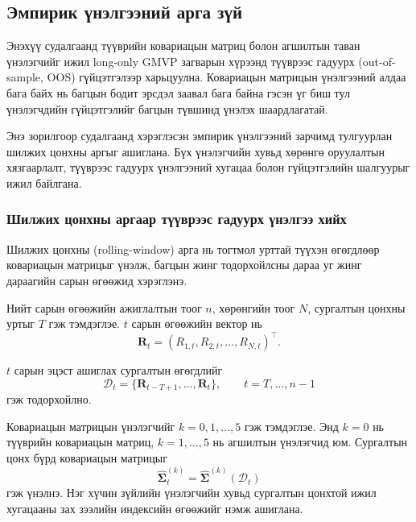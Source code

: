 \subsection{Эмпирик үнэлгээний арга зүй}
\label{subsec:empirical_framework}

Энэхүү судалгаанд түүврийн ковариацын матриц болон
агшилтын таван үнэлэгчийг ижил long-only GMVP
загварын хүрээнд түүврээс гадуурх
(out-of-sample, OOS) гүйцэтгэлээр харьцуулна.
Ковариацын матрицын үнэлгээний алдаа бага байх
нь багцын бодит эрсдэл заавал бага байна гэсэн
үг биш тул үнэлэгчдийн гүйцэтгэлийг багцын
түвшинд үнэлэх шаардлагатай.

Энэ зорилгоор
\citep{LedoitWolf2003,DeMiguelGarlappiUppal2009}
судалгаанд хэрэглэсэн эмпирик үнэлгээний
зарчимд тулгуурлан шилжих цонхны аргыг
ашиглана. Бүх үнэлэгчийн хувьд хөрөнгө
оруулалтын хязгаарлалт, түүврээс гадуурх
үнэлгээний хугацаа болон гүйцэтгэлийн
шалгуурыг ижил байлгана.


\subsubsection{Шилжих цонхны аргаар түүврээс гадуурх
	үнэлгээ хийх}
\label{subsubsec:rolling_window}

Шилжих цонхны (rolling-window) арга нь тогтмол
урттай түүхэн өгөгдлөөр ковариацын матрицыг
үнэлж, багцын жинг тодорхойлсны дараа уг
жинг дараагийн сарын өгөөжид хэрэглэнэ.

Нийт сарын өгөөжийн ажиглалтын тоог $n$,
хөрөнгийн тоог $N$, сургалтын цонхны
уртыг $T$ гэж тэмдэглэе.
$t$ сарын өгөөжийн вектор нь
\[
\boldsymbol{R}_t
=
(R_{1,t},R_{2,t},\ldots,R_{N,t})^\top.
\]

$t$ сарын эцэст ашиглах сургалтын өгөгдлийг
\[
\mathcal{D}_t
=
\{\boldsymbol{R}_{t-T+1},\ldots,
\boldsymbol{R}_t\},
\qquad t=T,\ldots,n-1
\]
гэж тодорхойлно.

Ковариацын матрицын үнэлэгчийг
$k=0,1,\ldots,5$ гэж тэмдэглэе.
Энд $k=0$ нь түүврийн ковариацын матриц,
$k=1,\ldots,5$ нь агшилтын үнэлэгчид юм.
Сургалтын цонх бүрд ковариацын матрицыг
\[
\widehat{\boldsymbol{\Sigma}}_t^{(k)}
=
\widehat{\boldsymbol{\Sigma}}^{(k)}
(\mathcal{D}_t)
\]
гэж үнэлнэ. Нэг хүчин зүйлийн үнэлэгчийн
хувьд сургалтын цонхтой ижил хугацааны
зах зээлийн индексийн өгөөжийг нэмж ашиглана.

